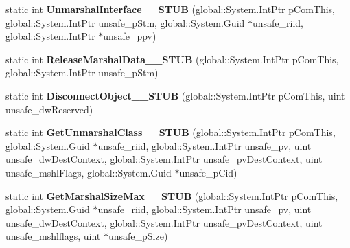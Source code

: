\begin{DoxyCompactItemize}
static int {\bfseries Unmarshal\+Interface\+\_\+\+\_\+\+S\+T\+UB} (global\+::\+System.\+Int\+Ptr p\+Com\+This, global\+::\+System.\+Int\+Ptr unsafe\+\_\+p\+Stm, global\+::\+System.\+Guid $\ast$unsafe\+\_\+riid, global\+::\+System.\+Int\+Ptr $\ast$unsafe\+\_\+ppv)
\item 
\mbox{\label{struct_system_1_1_runtime_1_1_interop_services_1_1_i_marshal_____system___runtime___windows_runtime_____impl_1_1_vtbl_acb4ef2d5853f6ed1823d32c7939a9c80}} 
static int {\bfseries Release\+Marshal\+Data\+\_\+\+\_\+\+S\+T\+UB} (global\+::\+System.\+Int\+Ptr p\+Com\+This, global\+::\+System.\+Int\+Ptr unsafe\+\_\+p\+Stm)
\item 
\mbox{\label{struct_system_1_1_runtime_1_1_interop_services_1_1_i_marshal_____system___runtime___windows_runtime_____impl_1_1_vtbl_a190a87511db9790b75721ec9fbbf6db5}} 
static int {\bfseries Disconnect\+Object\+\_\+\+\_\+\+S\+T\+UB} (global\+::\+System.\+Int\+Ptr p\+Com\+This, uint unsafe\+\_\+dw\+Reserved)
\item 
\mbox{\label{struct_system_1_1_runtime_1_1_interop_services_1_1_i_marshal_____system___runtime___windows_runtime_____impl_1_1_vtbl_a952344c0b9708ed27abae95ba1e22bc8}} 
static int {\bfseries Get\+Unmarshal\+Class\+\_\+\+\_\+\+S\+T\+UB} (global\+::\+System.\+Int\+Ptr p\+Com\+This, global\+::\+System.\+Guid $\ast$unsafe\+\_\+riid, global\+::\+System.\+Int\+Ptr unsafe\+\_\+pv, uint unsafe\+\_\+dw\+Dest\+Context, global\+::\+System.\+Int\+Ptr unsafe\+\_\+pv\+Dest\+Context, uint unsafe\+\_\+mshl\+Flags, global\+::\+System.\+Guid $\ast$unsafe\+\_\+p\+Cid)
\item 
\mbox{\label{struct_system_1_1_runtime_1_1_interop_services_1_1_i_marshal_____system___runtime___windows_runtime_____impl_1_1_vtbl_ae262511ad2d922da2fa5f9b7b21f17fa}} 
static int {\bfseries Get\+Marshal\+Size\+Max\+\_\+\+\_\+\+S\+T\+UB} (global\+::\+System.\+Int\+Ptr p\+Com\+This, global\+::\+System.\+Guid $\ast$unsafe\+\_\+riid, global\+::\+System.\+Int\+Ptr unsafe\+\_\+pv, uint unsafe\+\_\+dw\+Dest\+Context, global\+::\+System.\+Int\+Ptr unsafe\+\_\+pv\+Dest\+Context, uint unsafe\+\_\+mshlflags, uint $\ast$unsafe\+\_\+p\+Size)

\end{DoxyCompactItemize}
